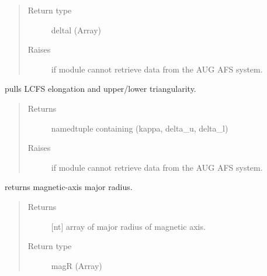 \documentclass[letterpaper,10pt,english]{sphinxmanual}
\begin{document}
\begin{fulllineitems}
\begin{fulllineitems}
\begin{quote}
\begin{description}
\item[{Return type}] \leavevmode
deltal (Array)

\item[{Raises}] \leavevmode
{} \textendash{} if module cannot retrieve data from the AUG AFS system.

\end{description}\end{quote}

\end{fulllineitems}


\begin{fulllineitems}
\label{\detokenize{eqtools:eqtools.AUGData.AUGDDData.getShaping}}
pulls LCFS elongation and upper/lower triangularity.
\begin{quote}\begin{description}
\item[{Returns}] \leavevmode
namedtuple containing (kappa, delta\_u, delta\_l)

\item[{Raises}] \leavevmode
{} \textendash{} if module cannot retrieve data from the AUG AFS system.

\end{description}\end{quote}

\end{fulllineitems}


\begin{fulllineitems}
\label{\detokenize{eqtools:eqtools.AUGData.AUGDDData.getMagR}}
returns magnetic-axis major radius.
\begin{quote}\begin{description}
\item[{Returns}] \leavevmode
{[}nt{]} array of major radius of magnetic axis.

\item[{Return type}] \leavevmode
magR (Array)


\end{description}
\end{quote}
\end{fulllineitems}
\end{fulllineitems}
\end{document}
